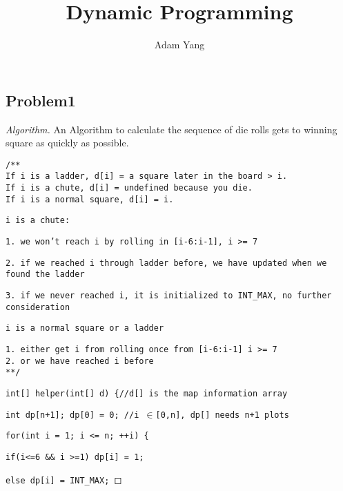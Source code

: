 \documentclass[openany]{article}
\begin{document}
\title{Dynamic Programming}
\author{Adam Yang}
\maketitle




\subsection*{Problem1}
\begin{proof}[Algorithm]{}{An Algorithm to calculate the sequence of die rolls gets to winning square as quickly as possible.}

    \renewcommand{\qedsymbol}{} %


    \texttt{/** \\ If i is a ladder, d[i] = a square later in the board > i.\\If i is a chute, d[i] = undefined because you die. \\If i is a normal square, d[i] = i.}

    \qquad \texttt{i is a chute:}

    \texttt{1. we won't reach i by rolling in [i-6:i-1], i >= 7}
    
    \texttt{2. if we reached i through ladder before, we have updated when we found the ladder}
    
    \texttt{3. if we never reached i, it is initialized to INT\_MAX, no further consideration}

    \qquad \texttt{i is a normal square or a ladder}

    \texttt{1. either get i from rolling once from [i-6:i-1] i >= 7\\2. or we have reached i before \\ **/}
    
    \texttt{int[] helper(int[] d) \{//d[] is the map information array}
    
    \qquad \texttt{int dp[n+1]; dp[0] = 0; //i $ \in$[0,n], dp[] needs n+1 plots}

    \qquad \texttt{for(int i = 1; i <= n; ++i) \{}

    \qquad \qquad \texttt{if(i<=6 \&\& i >=1) dp[i] = 1;}
    
    \qquad \qquad \texttt{else dp[i] = INT\_MAX;}
    

\end{proof}
\end{document}
